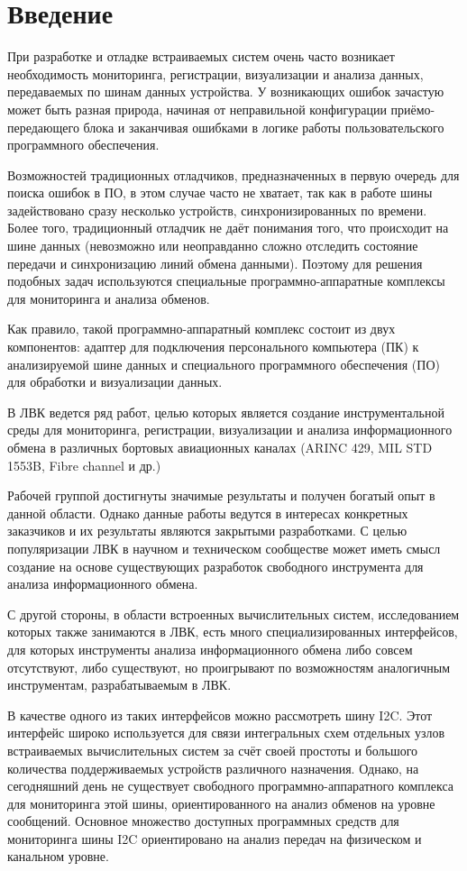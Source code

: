 \section*{Введение}

При разработке и отладке встраиваемых систем очень часто возникает необходимость мониторинга, регистрации, визуализации и анализа данных, передаваемых по шинам данных устройства. У возникающих ошибок зачастую может быть разная природа, начиная от неправильной конфигурации приёмо-передающего блока и заканчивая ошибками в логике работы пользовательского программного обеспечения.

Возможностей традиционных отладчиков, предназначенных в первую очередь для поиска ошибок в ПО, в этом случае часто не хватает, так как в работе шины задействовано сразу несколько устройств, синхронизированных по времени. Более того, традиционный отладчик не даёт понимания того, что происходит на шине данных (невозможно или неоправданно сложно отследить состояние передачи и синхронизацию линий обмена данными). Поэтому для решения подобных задач используются специальные программно-аппаратные комплексы для мониторинга и анализа обменов.

Как правило, такой программно-аппаратный комплекс состоит из двух компонентов: адаптер для подключения персонального компьютера (ПК) к анализируемой шине данных и специального программного обеспечения (ПО) для обработки и визуализации данных.

В ЛВК ведется ряд работ, целью которых является создание инструментальной среды для мониторинга, регистрации, визуализации и анализа информационного обмена в различных бортовых авиационных каналах (ARINC 429, MIL STD 1553B, Fibre channel и др.)

Рабочей группой достигнуты значимые результаты и получен богатый опыт в данной области. Однако данные работы ведутся в интересах конкретных заказчиков и их результаты являются закрытыми разработками. С целью популяризации ЛВК в научном и техническом сообществе может иметь смысл создание на основе существующих разработок свободного инструмента для анализа информационного обмена.

С другой стороны, в области встроенных вычислительных систем, исследованием которых также занимаются в ЛВК, есть много специализированных интерфейсов, для которых инструменты анализа информационного обмена либо совсем отсутствуют, либо существуют, но проигрывают по возможностям аналогичным инструментам, разрабатываемым в ЛВК.

В качестве одного из таких интерфейсов можно рассмотреть шину I2C. Этот интерфейс широко используется для связи интегральных схем отдельных узлов встраиваемых вычислительных систем за счёт своей простоты и большого количества поддерживаемых устройств различного назначения. Однако, на сегодняшний день не существует свободного программно-аппаратного комплекса для мониторинга этой шины, ориентированного на анализ обменов на уровне сообщений. Основное множество доступных программных средств для мониторинга шины I2C ориентировано на анализ передач на физическом и канальном уровне.

